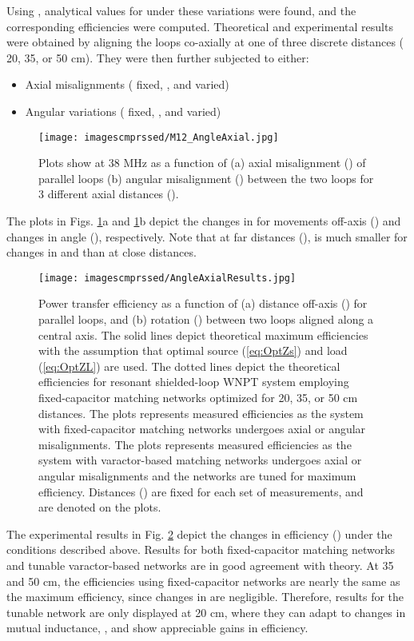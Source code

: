 \documentclass[journal]{IEEEtran}
\begin{document}
Using \cite{Grover, Mutual}, analytical values for  under these variations were found, and the corresponding efficiencies were computed. Theoretical and experimental results were obtained by aligning the loops co-axially at one of three discrete distances ( 20, 35, or 50 cm). They were then further subjected to either:
\begin{itemize}
\item Axial misalignments ( fixed, , and  varied)
\item Angular variations ( fixed, , and  varied)
\end{itemize}
\begin{figure}[htbp]
    \centering
    \texttt{[image: imagescmprssed/M12\_AngleAxial.jpg]}
    \caption{Plots show  at 38 MHz as a function of (a) axial misalignment () of parallel loops (b) angular misalignment () between the two loops for 3 different axial distances ().}
    \label{fig:M12_AngleAxial}
\end{figure}

The plots in Figs. \ref{fig:M12_AngleAxial}a and \ref{fig:M12_AngleAxial}b depict the changes in  for movements off-axis () and changes in angle (), respectively. Note that at far distances (),  is much smaller for changes in  and  than at close distances.
\begin{figure}[htbp]
    \centering
    \texttt{[image: imagescmprssed/AngleAxialResults.jpg]}
    \caption{Power transfer efficiency as a function of (a) distance off-axis () for parallel loops, and (b) rotation () between two loops aligned along a central axis. The solid lines depict theoretical maximum efficiencies with the assumption that optimal source (\ref{eq:OptZs}) and load (\ref{eq:OptZL}) are used. The dotted lines depict the theoretical efficiencies for resonant shielded-loop WNPT system employing fixed-capacitor matching networks optimized for 20, 35, or 50 cm distances. The   plots represents measured efficiencies as the system with fixed-capacitor matching networks undergoes axial or angular misalignments. The  plots represents measured efficiencies as the system with varactor-based matching networks undergoes axial or angular misalignments and the networks are tuned for maximum efficiency. Distances () are fixed for each set of measurements, and are denoted on the plots.}
    \label{fig:AngleAxialResults}
\end{figure}

The experimental results in Fig. \ref{fig:AngleAxialResults} depict the changes in efficiency () under the conditions described above. Results for both fixed-capacitor matching networks and tunable varactor-based networks are in good agreement with theory. At  35 and 50 cm, the efficiencies using fixed-capacitor networks are nearly the same as the maximum efficiency, since changes in  are negligible. Therefore, results for the tunable network are only displayed at 20 cm, where they can adapt to changes in mutual inductance, , and show appreciable gains in efficiency.
\end{document}
